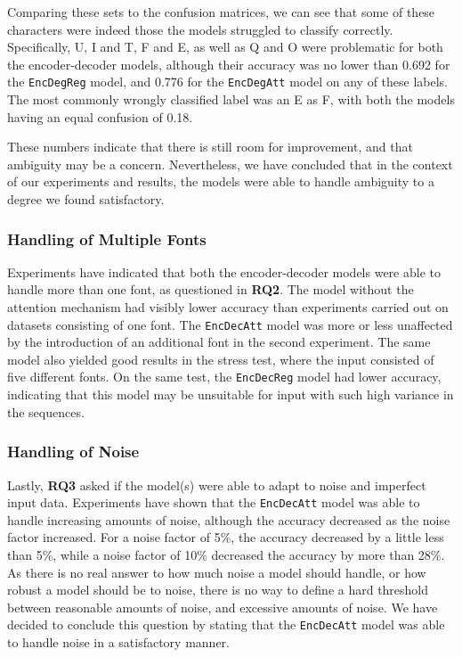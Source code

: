 Comparing these sets to the confusion matrices, we can see that some of these characters were indeed those the models struggled to classify correctly. Specifically, U, I and T, F and E, as well as Q and O were problematic for both the encoder-decoder models, although their accuracy was no lower than 0.692 for the {\tt EncDegReg} model, and 0.776 for the {\tt EncDegAtt} model on any of these labels. The most commonly wrongly classified label was an E as F, with both the models having an equal confusion of 0.18. 

These numbers indicate that there is still room for improvement, and that ambiguity may be a concern. Nevertheless, we have concluded that in the context of our experiments and results, the models were able to handle ambiguity to a degree we found satisfactory.

\newpage
\subsubsection{Handling of Multiple Fonts}
Experiments have indicated that both the encoder-decoder models were able to handle more than one font, as questioned in \textbf{RQ2}. The model without the attention mechanism had visibly lower accuracy than experiments carried out on datasets consisting of one font. The {\tt EncDecAtt} model was more or less unaffected by the introduction of an additional font in the second experiment. The same model also yielded good results in the stress test, where the input consisted of five different fonts. On the same test, the {\tt EncDecReg} model had lower accuracy, indicating that this model may be unsuitable for input with such high variance in the sequences.

\subsubsection{Handling of Noise}
Lastly, \textbf{RQ3} asked if the model(s) were able to adapt to noise and imperfect input data. Experiments have shown that the {\tt EncDecAtt} model was able to handle increasing amounts of noise, although the accuracy decreased as the noise factor increased. For a noise factor of 5\%, the accuracy decreased by a little less than 5\%, while a noise factor of 10\% decreased the accuracy by more than 28\%. As there is no real answer to how much noise a model should handle, or how robust a model should be to noise, there is no way to define a hard threshold between reasonable amounts of noise, and excessive amounts of noise. We have decided to conclude this question by stating that the {\tt EncDecAtt} model was able to handle noise in a satisfactory manner. 


